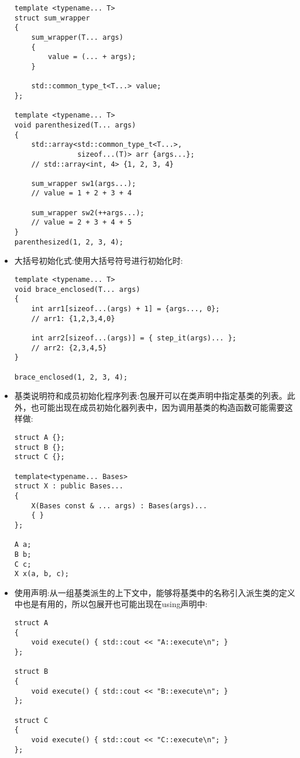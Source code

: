 \begin{itemize}
\begin{lstlisting}[style=styleCXX]
template <typename... T>
struct sum_wrapper
{
	sum_wrapper(T... args)
	{
		value = (... + args);
	}

	std::common_type_t<T...> value;
};

template <typename... T>
void parenthesized(T... args)
{
	std::array<std::common_type_t<T...>,
	           sizeof...(T)> arr {args...};
	// std::array<int, 4> {1, 2, 3, 4}
	
	sum_wrapper sw1(args...);
	// value = 1 + 2 + 3 + 4
	
	sum_wrapper sw2(++args...);
	// value = 2 + 3 + 4 + 5
}
parenthesized(1, 2, 3, 4);
\end{lstlisting}

\item
大括号初始化式:使用大括号符号进行初始化时:

\begin{lstlisting}[style=styleCXX]
template <typename... T>
void brace_enclosed(T... args)
{
	int arr1[sizeof...(args) + 1] = {args..., 0};
	// arr1: {1,2,3,4,0}
	
	int arr2[sizeof...(args)] = { step_it(args)... };
	// arr2: {2,3,4,5}
}

brace_enclosed(1, 2, 3, 4);
\end{lstlisting}

\item
基类说明符和成员初始化程序列表:包展开可以在类声明中指定基类的列表。此外，也可能出现在成员初始化器列表中，因为调用基类的构造函数可能需要这样做:

\begin{lstlisting}[style=styleCXX]
struct A {};
struct B {};
struct C {};

template<typename... Bases>
struct X : public Bases...
{
	X(Bases const & ... args) : Bases(args)...
	{ }
};

A a;
B b;
C c;
X x(a, b, c);
\end{lstlisting}

\item
使用声明:从一组基类派生的上下文中，能够将基类中的名称引入派生类的定义中也是有用的，所以包展开也可能出现在using声明中:

\begin{lstlisting}[style=styleCXX]
struct A
{
	void execute() { std::cout << "A::execute\n"; }
};

struct B
{
	void execute() { std::cout << "B::execute\n"; }
};

struct C
{
	void execute() { std::cout << "C::execute\n"; }
};


\end{lstlisting}
\end{itemize}
